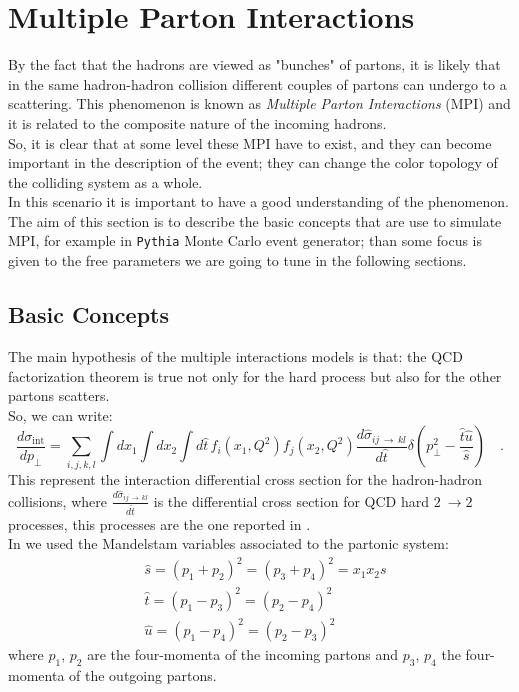 
\chapter{Multiple Parton Interactions}
\label{chap:MultiplePartonInteractions}


By the fact that the hadrons are viewed as "bunches" of partons, it is likely that in the same hadron-hadron collision different couples of partons can undergo to a scattering. This phenomenon is known as \textit{Multiple Parton Interactions} (MPI) and it is related to the composite nature of the incoming hadrons. 
\\
So, it is clear that at some level these MPI have to exist, and they can become important in the description of the event; they can change the color topology of the colliding system as a whole.  
\\
In this scenario it is important to have a good understanding of the phenomenon. The aim of this section is to describe the basic concepts that are use to simulate MPI, for example in \texttt{Pythia} Monte Carlo event generator; than some focus is given to the free parameters we are going to tune in the following sections.

\section{Basic Concepts}
\label{sec:BasicConcepts}

The main hypothesis of the multiple interactions models is that: the QCD factorization theorem is true not only for the hard process but also for the other partons scatters.
\\
So, we can write:
\begin{equation}
	\frac{d\sigma_{\text{int}}}{dp_\perp}=\displaystyle\sum_{i,j,k,l}\displaystyle\int dx_1 \displaystyle\int dx_2 \displaystyle\int d\hat{t}\, f_i(x_1,Q^2)f_j(x_2,Q^2)\frac{d\hat{\sigma}_{ij\,\rightarrow\,kl}}{d\hat{t}}\delta\left( p_\perp^2-\frac{\hat{t}\hat{u}}{\hat{s}} \right) \quad .
	\label{eq:sigma_int1}
\end{equation}
This represent the interaction differential cross section for the hadron-hadron collisions, where $\frac{d\hat{\sigma}_{ij\,\rightarrow\,kl}}{d\hat{t}}$ is the differential cross section for QCD hard $2\ \rightarrow 2$ processes, this processes are the one reported in . 
\\
In  we used the Mandelstam variables associated to the partonic system:
\begin{align}
	&\hat{s}=(p_1+p_2)^2=(p_3+p_4)^2=x_1x_2s\\
	&\hat{t}=(p_1-p_3)^2=(p_2-p_4)^2\\
	&\hat{u}=(p_1-p_4)^2=(p_2-p_3)^2
\end{align} 
where $p_1$, $p_2$ are the four-momenta of the incoming partons and $p_3$, $p_4$ the four-momenta of the outgoing partons. 

